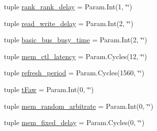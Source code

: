 \begin{DoxyCompactItemize}
\item 
tuple \hyperlink{classRubyMemoryControl_1_1RubyMemoryControl_a6f5a18d50b299082a7f897d5699e9cdb}{rank\_\-rank\_\-delay} = Param.Int(1, \char`\"{}\char`\"{})
\item 
tuple \hyperlink{classRubyMemoryControl_1_1RubyMemoryControl_a5f58d2f59a8410bc35bcaf27ecf8dfc0}{read\_\-write\_\-delay} = Param.Int(2, \char`\"{}\char`\"{})
\item 
tuple \hyperlink{classRubyMemoryControl_1_1RubyMemoryControl_a99d4bb1990fb6326e68315b504c2b51c}{basic\_\-bus\_\-busy\_\-time} = Param.Int(2, \char`\"{}\char`\"{})
\item 
tuple \hyperlink{classRubyMemoryControl_1_1RubyMemoryControl_a0d4cf230a611e11e81bec6b19b9d7905}{mem\_\-ctl\_\-latency} = Param.Cycles(12, \char`\"{}\char`\"{})
\item 
tuple \hyperlink{classRubyMemoryControl_1_1RubyMemoryControl_a6aca5df78eaeec04d5840be10152a753}{refresh\_\-period} = Param.Cycles(1560, \char`\"{}\char`\"{})
\item 
tuple \hyperlink{classRubyMemoryControl_1_1RubyMemoryControl_a8ab7e573e329c9b4af3eecf522a4ed0d}{tFaw} = Param.Int(0, \char`\"{}\char`\"{})
\item 
tuple \hyperlink{classRubyMemoryControl_1_1RubyMemoryControl_ad26b080597ab0eb47bb0edb8f76f9530}{mem\_\-random\_\-arbitrate} = Param.Int(0, \char`\"{}\char`\"{})
\item 
tuple \hyperlink{classRubyMemoryControl_1_1RubyMemoryControl_aa650cc7a1996e102be65e35a0d7d5764}{mem\_\-fixed\_\-delay} = Param.Cycles(0, \char`\"{}\char`\"{})
\end{DoxyCompactItemize}


